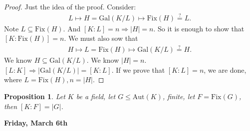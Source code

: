 \documentclass[9pt,reqno,twoside]{amsbook}
\theoremstyle{plain}
\numberwithin{section}{chapter}
\numberwithin{equation}{chapter}
\newtheorem{Prop}[theorem]{Proposition}
\theoremstyle{definition}
\theoremstyle{remark}
\theoremstyle{plain}
\newcommand{\sub}{\subseteq}
\newcommand{\bb}{\vspace{3mm}}
\newcommand{\bee}{\begin{equation}\begin{aligned}}
\newcommand{\eee}{\end{aligned}\end{equation}}
\newcommand{\gal}{\mathrm{Gal}}
\newcommand{\aut}{\mathrm{Aut}}
\newcommand{\fix}{\mathrm{Fix}}
\renewcommand{\leq}{\leqslant}
\begin{document}
\begin{proof}
Just the idea of the proof. Consider:
\bee
L \mapsto H = \gal(K/L) \mapsto \fix(H) \overset{?}{=}L.
\eee
Note $L \sub \fix(H)$. And $[K:L] = n \Rightarrow|H| = n$. So it is enough to show that $[K:\fix(H)] = n$. We must also sow that 
\bee
H \mapsto L = \fix(H) \mapsto \gal(K/L) \overset{?}{=} H.
\eee
We know $H \sub \gal(K/L)$. We know $|H| = n$. $[L:K] \Rightarrow |\gal(K/L)| = [K:L]$. If we prove that $[K:L] = n$, we are done, where $L = \fix(H), n = |H|$. 
\end{proof}

\begin{Prop}
Let $K$ be a field, let $G \leq \aut(K)$, finite, let $F = \fix(G)$, then $[K:F] = |G|$. 
\end{Prop}


\bb

\textbf{Friday, March 6th}
\end{document}
